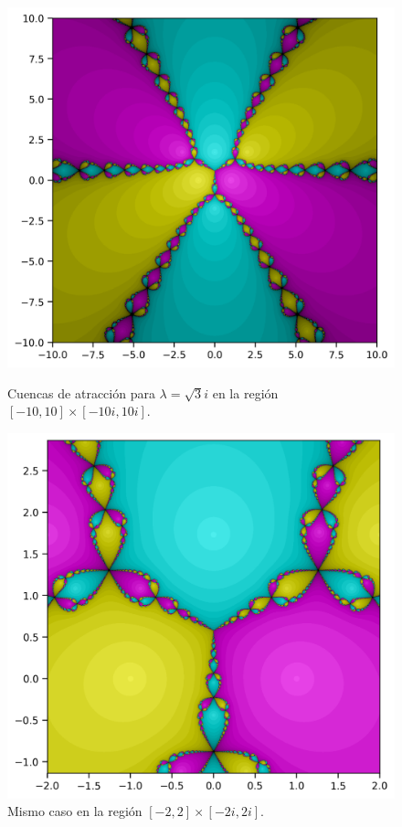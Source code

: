 \begin{figure}[H]
\centering 
\begin{minipage}[b]{0.48\textwidth}
\centering
\includegraphics[width=\textwidth]{img/sch_sqrt3i_1.png}
\caption{Cuencas de atracción para $\lambda=\sqrt{3}i$ en la región $[-10,10]\times[-10i,10i]$.}
\label{fig:cuenca_triangulo_1}
\end{minipage}
\hfill
\begin{minipage}[b]{0.48\textwidth}
\centering
\includegraphics[width=\textwidth]{img/sch_sqrt3i_2.png}
\caption{Mismo caso en la región $[-2,2]\times[-2i,2i]$.}
\label{fig:cuenca_triangulo_2}
\end{minipage}
\end{figure}

